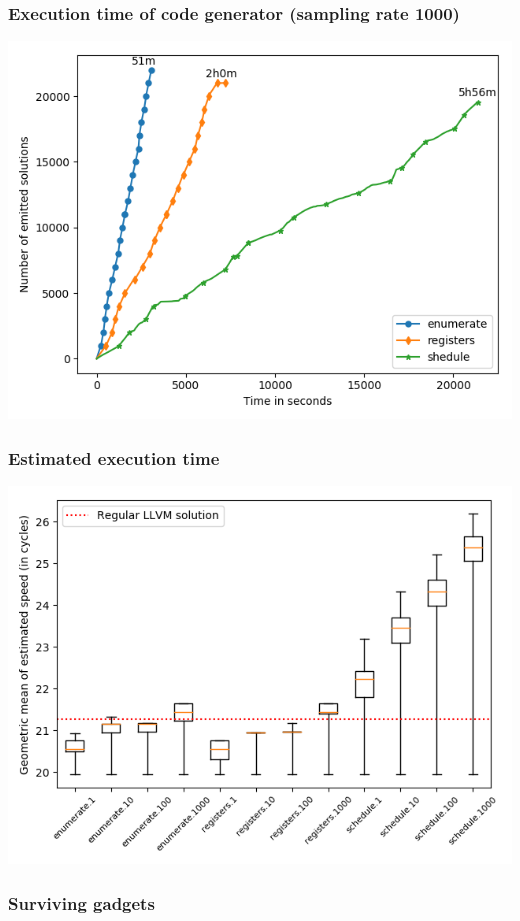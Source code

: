 \begin{frame}
	\frametitle{Execution time of code generator (sampling rate 1000)}

	\includegraphics[width=\textwidth]{../results/figures/generator_time}

\end{frame}

\begin{frame}
	\frametitle{Estimated execution time}

	\includegraphics[width=\textwidth]{../results/figures/cost_speed}

\end{frame}

\begin{frame}
	\frametitle{Surviving gadgets}


\end{frame}

